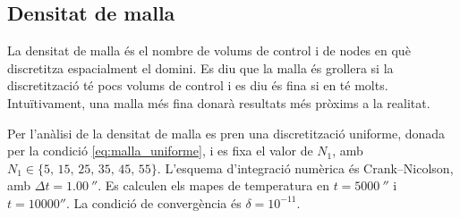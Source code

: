 
\subsection{Densitat de malla}

La densitat de malla és el nombre de volums de control i de nodes en què discretitza espacialment el domini. Es diu que la malla és grollera si la discretització té pocs volums de control i es diu és fina si en té molts. Intuïtivament, una malla més fina donarà resultats més pròxims a la realitat.

Per l'anàlisi de la densitat de malla es pren una discretització uniforme, donada per la condició \eqref{eq:malla_uniforme}, i es fixa el valor de $N_1$, amb $N_1 \in \{ 5, \, 15, \, 25, \, 35, \, 45, \, 55\}$. L'esquema d'integració numèrica és Crank--Nicolson, amb $\Delta t = 1.00 \ \second$. Es calculen els mapes de temperatura en $t = 5000 \ \second$ i $t = 10000 \second$. La condició de convergència és $\delta = 10^{-11}$. 


